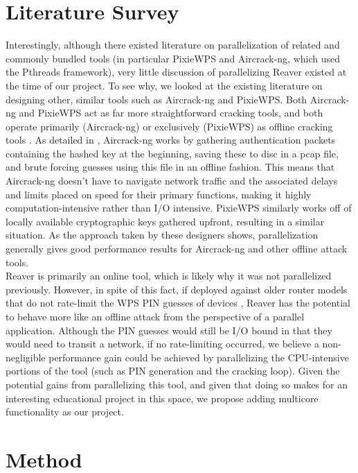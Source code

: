 \documentclass[a4paper]{article}
\begin{document}
\section{Literature Survey}

Interestingly, although there existed literature on parallelization of related and commonly bundled tools (in particular PixieWPS and Aircrack-ng, which used the Pthreads framework), very little discussion of parallelizing Reaver existed at the time of our project. To see why, we looked at the existing literature on designing other, similar tools such as Aircrack-ng and PixieWPS. Both Aircrack-ng and PixieWPS act as far more straightforward cracking tools, and both operate primarily (Aircrack-ng) or exclusively (PixieWPS) as offline cracking tools \cite{viehbock}. As detailed in \cite{aircrack}, Aircrack-ng works by gathering authentication packets containing the hashed key at the beginning, saving these to disc in a pcap file, and brute forcing guesses using this file in an offline fashion. This means that Aircrack-ng doesn't have to navigate network traffic and the associated delays and limits placed on speed for their primary functions, making it highly computation-intensive rather than I/O intensive. PixieWPS similarly works off of locally available cryptographic keys gathered upfront, resulting in a similar situation. As the approach taken by these designers shows, parallelization generally gives good performance results for Aircrack-ng and other offline attack tools.\\
Reaver is primarily an online tool, which is likely why it was not parallelized previously. However, in spite of this fact, if deployed against older router models that do not rate-limit the WPS PIN guesses of devices \cite{viehbock}, Reaver has the potential to behave more like an offline attack from the perspective of a parallel application. Although the PIN guesses would still be I/O bound in that they would need to transit a network, if no rate-limiting occurred, we believe a non-negligible performance gain could be achieved by parallelizing the CPU-intensive portions of the tool (such as PIN generation and the cracking loop). Given the potential gains from parallelizing this tool, and given that doing so makes for an interesting educational project in this space, we propose adding multicore functionality as our project.


\section{Method}
\end{document}
